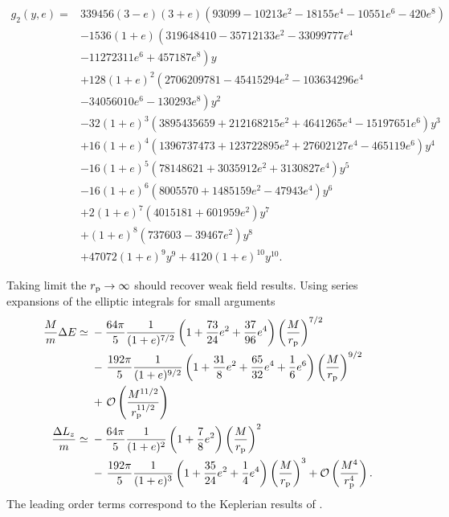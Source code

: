 \begin{align}
g_2(y, e) = {} & 339456 (3 - e) (3 + e) \left(93099 - 10213 e^2 - 18155 e^4 - 10551 e^6 - 420 e^8 \right) \nonumber \\
 {} & - \left. 1536 (1 + e) \left(319648410 - 35712133 e^2 - 33099777 e^4  \right.\right. \nonumber \\
 {} & - \left.\left. 11272311 e^6 +457187 e^8\right) y \right. \nonumber \\
 {} & + \left. 128 (1 + e)^2 \left(2706209781 - 45415294 e^2 - 103634296 e^4 \right.\right. \nonumber \\
 {} & - \left.\left. 34056010 e^6 - 130293 e^8\right) y^2 \right. \nonumber \\
 {} & - \left. 32 (1 + e)^3 \left(3895435659 + 212168215 e^2 + 4641265 e^4 - 15197651 e^6 \right) y^3 \right. \nonumber \\
 {} & + \left. 16 (1 + e)^4 \left(1396737473 + 123722895 e^2 + 27602127 e^4 - 465119 e^6 \right) y^4 \right. \nonumber \\
 {} & - \left. 16 (1 + e)^5 \left(78148621 + 3035912 e^2 + 3130827 e^4\right) y^5 \right. \nonumber \\
 {} & - \left. 16 (1 + e)^6 \left(8005570 + 1485159 e^2 - 47943 e^4\right) y^6 \right. \nonumber \\
 {} & + \left. 2 (1 + e)^7 \left(4015181 + 601959 e^2\right) y^7 \right. \nonumber \\
 {} & + \left. (1 + e)^8 \left(737603 - 39467 e^2\right) y^8 \right. \nonumber \\
 {} & + \left. 47072 (1 + e)^9 y^9 + 4120 (1 + e)^{10} y^{10}. \right.
\end{align}

Taking limit the $r_\mathrm{p} \rightarrow \infty$ should recover weak field results. Using series expansions of the elliptic integrals for small arguments
\begin{align}
\dfrac{M}{m} \Delta E \simeq {} & -\dfrac{64\pi}{5} \dfrac{1}{(1 + e)^{{7}/{2}}} \left(1 + \dfrac{73}{24} e^2 + \dfrac{37}{96} e^{4}\right) \left(\dfrac{M}{r_\mathrm{p}}\right)^{7/2} \nonumber \\
 {} & - \left. \dfrac{192\pi}{5} \dfrac{1}{(1 + e)^{{9}/{2}}} \left(1 + \dfrac{31}{8} e^2 + \dfrac{65}{32} e^4 + \dfrac{1}{6}e^6\right) \left(\dfrac{M}{r_\mathrm{p}}\right)^{9/2} \right. \nonumber \\*
 {} & + \left. \mathcal{O}\left({\dfrac{M^{11/2}}{r_\mathrm{p}^{11/2}}}\right) \right. \\
\dfrac{\Delta L_{z}}{m} \simeq {} & -\dfrac{64\pi}{5} \dfrac{1}{(1 + e)^{2}} \left(1 + \dfrac{7}{8} e^{2}\right) \left(\dfrac{M}{r_\mathrm{p}}\right)^{2} \nonumber \\
 {} & - \left. \dfrac{192 \pi}{5} \dfrac{1}{(1 + e)^3} \left(1 + \dfrac{35}{24} e^2 + \dfrac{1}{4} e^4\right) \left(\dfrac{M}{r_\mathrm{p}}\right)^{3}  + \mathcal{O}\left({\dfrac{M^{4}}{r_\mathrm{p}^{4}}}\right). \right.
\end{align}
The leading order terms correspond to the Keplerian results of \cite{Peters1964}.

